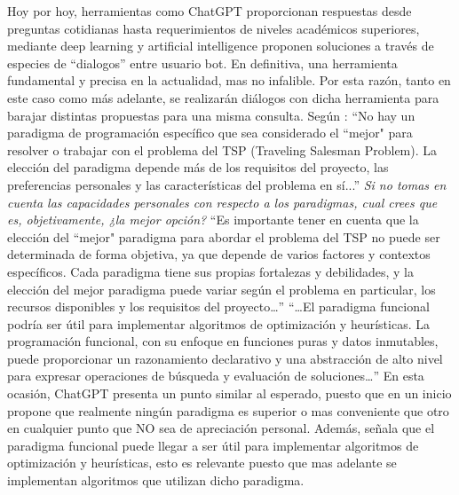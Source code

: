                 Hoy por hoy, herramientas como ChatGPT proporcionan respuestas desde preguntas cotidianas hasta requerimientos de niveles académicos superiores, mediante deep learning y artificial intelligence proponen soluciones a través de especies de “dialogos” entre usuario bot. En definitiva, una herramienta fundamental y precisa en la actualidad, mas no infalible.
                \newline
                \newline
                Por esta razón, tanto en este caso como más adelante, se realizarán diálogos con dicha herramienta para barajar distintas propuestas para una misma consulta.
                \newline
                \newline
                Según \parencite{GPTPARADIGMAS}: “No hay un paradigma de programación específico que sea considerado el “mejor" para resolver o trabajar con el problema del TSP (Traveling Salesman Problem). La elección del paradigma depende más de los requisitos del proyecto, las preferencias personales y las características del problema en sí...”
                \newpage
                \textit{Si no tomas en cuenta las capacidades personales con respecto a los paradigmas, cual crees que es, objetivamente, ¿la mejor opción?}
                \newline
                \newline
                “Es importante tener en cuenta que la elección del “mejor" paradigma para abordar el problema del TSP no puede ser determinada de forma objetiva, ya que depende de varios factores y contextos específicos. Cada paradigma tiene sus propias fortalezas y debilidades, y la elección del mejor paradigma puede variar según el problema en particular, los recursos disponibles y los requisitos del proyecto…”
                \newline
                \newline
                “…El paradigma funcional podría ser útil para implementar algoritmos de optimización y heurísticas. La programación funcional, con su enfoque en funciones puras y datos inmutables, puede proporcionar un razonamiento declarativo y una abstracción de alto nivel para expresar operaciones de búsqueda y evaluación de soluciones…”
                \newline
                \newline
                En esta ocasión, ChatGPT presenta un punto similar al esperado, puesto que en un inicio propone que realmente ningún paradigma es superior o mas conveniente que otro en cualquier punto que NO sea de apreciación personal. Además, señala que el paradigma funcional puede llegar a ser útil para implementar algoritmos de optimización y heurísticas, esto es relevante puesto que mas adelante se implementan algoritmos que utilizan dicho paradigma.
